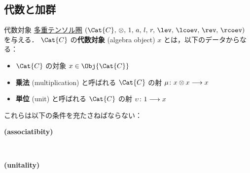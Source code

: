\documentclass[TQFT_main]{subfiles}
\begin{document}
\subsection{代数と加群}

\begin{mydef}[label=def:algobj,breakable]{代数対象}
    \hyperref[def:tensorfusion-cat]{多重テンソル圏} $(\Cat{C},\, \otimes,\, 1,\, a,\, l,\, r,\, \lev,\, \lcoev,\, \rev,\, \rcoev)$ を与える．
    $ \Cat{C}$ の\textbf{代数対象} (algebra object) $x$ とは，以下のデータからなる：
    \begin{itemize}
        \item $\Cat{C}$ の対象 $x \in \Obj{\Cat{C}}$ 
        \item \textbf{乗法} (multiplication) と呼ばれる $\Cat{C}$ の射 $\mu \colon x \otimes x \longrightarrow x$
        \item \textbf{単位} (unit) と呼ばれる $\Cat{C}$ の射 $\upsilon \colon 1 \longrightarrow x$
    \end{itemize}
    これらは以下の条件を充たさねばならない：
    \begin{description}
        \item[\textbf{(associatibity)}]　
        
        \begin{center}
        \end{center}
    
        \item[\textbf{(unitality)}]　
        
        \begin{center}
        \end{center}
        

\end{description}
\end{mydef}
\end{document}

